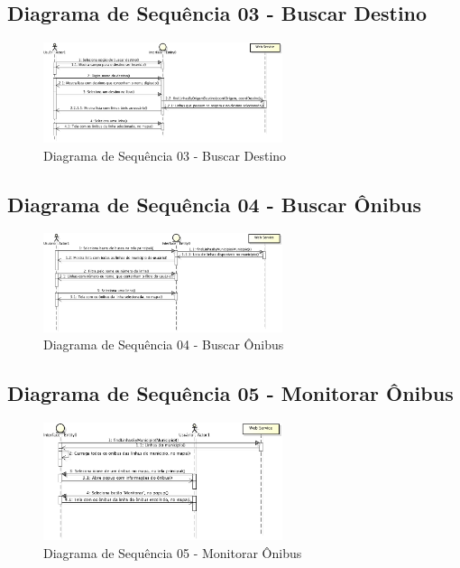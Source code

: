 \subsection{Diagrama de Sequência 03 - Buscar Destino}
\begin{figure}[!h]
\begin{center}
  \includegraphics[width=7cm]{images/Diagramas/Diagram_de_Sequencia-Buscar_Destino.png}
  \caption{Diagrama de Sequ\^{e}ncia 03 - Buscar Destino}
  \label{fig:diagramaSequenciaBuscarDestino}
\end{center}
\end{figure}

\subsection{Diagrama de Sequência 04 - Buscar Ônibus}
\begin{figure}[!h]
\begin{center}
  \includegraphics[width=7cm]{images/Diagramas/Diagram_de_Sequencia-Buscar_Onibus.png}
  \caption{Diagrama de Sequ\^{e}ncia 04 - Buscar \^{O}nibus}
  \label{fig:diagramaSequenciaBuscarOnibus}
\end{center}
\end{figure}

\subsection{Diagrama de Sequência 05 - Monitorar Ônibus}
\begin{figure}[!h]
\begin{center}
  \includegraphics[width=7cm]{images/Diagramas/Diagram_de_Sequencia-Monitorar_Onibus.png}
  \caption{Diagrama de Sequ\^{e}ncia 05 - Monitorar \^{O}nibus}
  \label{fig:diagramaSequenciaMonitorarOnibus}
\end{center}
\end{figure}


